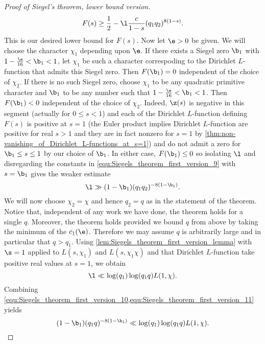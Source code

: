 \begin{proof}[Proof of Siegel's theorem, lower bound version]
        \begin{equation}\label{equ:Siegels_theorem_first_version_9}
          F(s) \ge \frac{1}{2}-\l\frac{c}{1-s}(q_{1}q_{2})^{8(1-s)}.
        \end{equation}
        This is our desired lower bound for $F(s)$. Now let $\e > 0$ be given. We will choose the character $\chi_{1}$ depending upon $\e$. If there exists a Siegel zero $\b_{1}$ with $1-\frac{\e}{16} < \b_{1} < 1$, let $\chi_{1}$ be such a character correspoding to the Dirichlet $L$-function that admits this Siegel zero. Then $F(\b_{1}) = 0$ independent of the choice of $\chi_{2}$. If there is no such Siegel zero, choose $\chi_{1}$ to be any quadratic primitive character and $\b_{1}$ to be any number such that $1-\frac{\e}{16} < \b_{1} < 1$. Then $F(\b_{1}) < 0$ independent of the choice of $\chi_{2}$. Indeed, $\z(s)$ is negative in this segment (actually for $0 \le s < 1$) and each of the Dirichlet $L$-function defining $F(s)$ is positive at $s = 1$ (the Euler product implies Dirichlet $L$-function are positive for real $s > 1$ and they are in fact nonzero for $s = 1$ by \cref{thm:non-vanishing_of_Dirichlet_L-functions_at_s=1}) and do not admit a zero for $\b_{1} \le s \le 1$ by our choice of $\b_{1}$. In either case, $F(\b_{1}) \le 0$ so isolating $\l$ and disregarding the constants in \cref{equ:Siegels_theorem_first_version_9} with $s = \b_{1}$ gives the weaker estimate
        \begin{equation}\label{equ:Siegels_theorem_first_version_10}
          \l \gg (1-\b_{1})(q_{1}q_{2})^{-8(1-\b_{1})}.
        \end{equation}
        We will now choose $\chi_{2} = \chi$ and hence $q_{2} = q$ as in the statement of the theorem. Notice that, independent of any work we have done, the theorem holds for a single $q$. Moreover, the theorem holds provided we bound $q$ from above by taking the minimum of the $c_{1}(\e)$. Therefore we may assume $q$ is arbitrarily large and in particular that $q > q_{1}$. Using \cref{lem:Siegels_theorem_first_version_lemma} with $\s = 1$ applied to $L(s,\chi_{1})$ and $L(s,\chi_{1}\chi)$ and that Dirichlet $L$-function take positive real values at $s = 1$, we obtain
        \begin{equation}\label{equ:Siegels_theorem_first_version_11}
          \l \ll \log(q_{1})\log(q_{1}q)L(1,\chi).
        \end{equation}
        Combining \cref{equ:Siegels_theorem_first_version_10,equ:Siegels_theorem_first_version_11} yields
        \[
          (1-\b_{1})(q_{1}q)^{-8(1-\b_{1})} \ll \log(q_{1})\log(q_{1}q)L(1,\chi).
\]
\end{proof}
